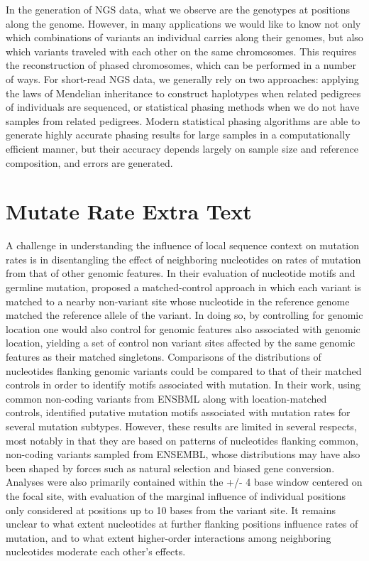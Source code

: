 In the generation of NGS data, what we observe are the genotypes at positions along the genome. However, in many applications we would like to know not only which combinations of variants an individual carries along their genomes, but also which variants traveled with each other on the same chromosomes. This requires the reconstruction of phased chromosomes, which can be performed in a number of ways. For short-read NGS data, we generally rely on two approaches: applying the laws of Mendelian inheritance to construct haplotypes when related pedigrees of individuals are sequenced, or statistical phasing methods when we do not have samples from related pedigrees. Modern statistical phasing algorithms \citep{Browning2021, Hofmeister2023, Loh2016} are able to generate highly accurate phasing results for large samples in a computationally efficient manner, but their accuracy depends largely on sample size and reference composition, and errors are generated.

\section{Mutate Rate Extra Text}
A challenge in understanding the influence of local sequence context on mutation rates is in disentangling the effect of neighboring nucleotides on rates of mutation from that of other genomic features. In their evaluation of nucleotide motifs and germline mutation, \citep{Zhu2017} proposed a matched-control approach in which each variant is matched to a nearby non-variant site whose nucleotide in the reference genome matched the reference allele of the variant. In doing so, by controlling for genomic location one would also control for genomic features also associated with genomic location, yielding a set of control non variant sites affected by the same genomic features as their matched singletons. Comparisons of the distributions of nucleotides flanking genomic variants could be compared to that of their matched controls in order to identify motifs associated with mutation. In their work, using common non-coding variants from ENSBML along with location-matched controls, \citep{Zhu2017} identified putative mutation motifs associated with mutation rates for several mutation subtypes. However, these results are limited in several respects, most notably in that they are based on patterns of nucleotides flanking common, non-coding variants sampled from ENSEMBL, whose distributions may have also been shaped by forces such as natural selection and biased gene conversion. Analyses were also primarily contained within the +/- 4 base window centered on the focal site, with evaluation of the marginal influence of individual positions only considered at positions up to 10 bases from the variant site. It remains unclear to what extent nucleotides at further flanking positions influence rates of mutation, and to what extent higher-order interactions among neighboring nucleotides moderate each other’s effects.

